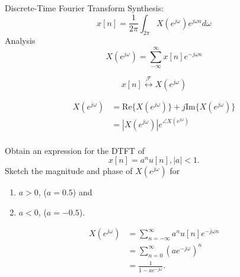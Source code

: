 \begin{frame}{Discrete-Time Fourier Transform}
    Synthesis:
    \begin{equation*}
        x[n] = \frac{1}{2\pi}\int_{2\pi}X(e^{j\omega})e^{j\omega n}d\omega
    \end{equation*}
    Analysis
    \begin{equation*}
        X(e^{j\omega}) = \sum_{-\infty}^{\infty}x[n]e^{-j\omega n}
    \end{equation*}

    \begin{equation*}
        x[n] \overset{\mathcal{F}}{\leftrightarrow} X(e^{j\omega})
    \end{equation*}

    \begin{equation*}
        \begin{split}
            X(e^{j\omega}) &= \mathrm{Re}\{X(e^{j\omega})\} + j\mathrm{Im}\{X(e^{j\omega})\}\\
            &= |X(e^{j\omega})| e^{\angle X(e^{j\omega})}\\
        \end{split}
    \end{equation*}
\end{frame}


\begin{frame}
    \begin{example}
        Obtain an expression for the DTFT of
        \begin{equation*}
            x[n] = a^nu[n], |a|<1.
        \end{equation*}
        Sketch the magnitude and phase of $X(e^{j\omega})$ for
        \begin{enumerate}
            \item $a>0$, ($a=0.5$) and
            \item $a<0$, ($a=-0.5$).
        \end{enumerate}
     \end{example}
\end{frame}



\begin{frame}
    {
        \begin{align*}
            X(e^{j\omega}) &= \sum_{n=-\infty}^{\infty} a^nu[n]e^{-j\omega n}\\
            &= \sum_{n = 0}^{\infty} (ae^{-j\omega})^n\\
            &= \frac{1}{1-ae^{-j\omega}}.
        \end{align*}
    }
\end{frame}



